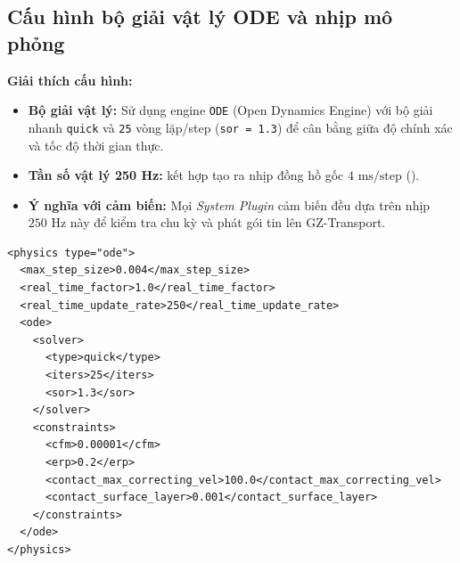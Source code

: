 \documentclass[11pt,a4paper]{article}
\begin{document}
\subsection{Cấu hình bộ giải vật lý ODE và nhịp mô phỏng}
\noindent
\begin{minipage}[t]{0.45\textwidth}
\vspace{0pt}
\textbf{Giải thích cấu hình:}
\begin{itemize}
    \item \textbf{Bộ giải vật lý:} Sử dụng engine \texttt{ODE} (Open Dynamics Engine) với bộ giải nhanh \texttt{quick} và \texttt{25} vòng lặp/step (\texttt{sor = 1.3}) để cân bằng giữa độ chính xác và tốc độ thời gian thực.
    \item \textbf{Tần số vật lý 250 Hz:}  kết hợp  tạo ra nhịp đồng hồ gốc $4\text{ ms/step}$ ().
    \item \textbf{Ý nghĩa với cảm biến:} Mọi \emph{System Plugin} cảm biến đều dựa trên nhịp $250\text{ Hz}$ này để kiểm tra chu kỳ  và phát gói tin lên GZ-Transport.
\end{itemize}
\end{minipage}
\hfill
\begin{minipage}[t]{0.52\textwidth}
\vspace{0pt}
\begin{lstlisting}[language=SDF, firstnumber=5]
<physics type="ode">
  <max_step_size>0.004</max_step_size>
  <real_time_factor>1.0</real_time_factor>
  <real_time_update_rate>250</real_time_update_rate>
  <ode>
    <solver>
      <type>quick</type>
      <iters>25</iters>
      <sor>1.3</sor>
    </solver>
    <constraints>
      <cfm>0.00001</cfm>
      <erp>0.2</erp>
      <contact_max_correcting_vel>100.0</contact_max_correcting_vel>
      <contact_surface_layer>0.001</contact_surface_layer>
    </constraints>
  </ode>
</physics>
\end{lstlisting}
\end{minipage}

\vspace{1em}

\end{document}
